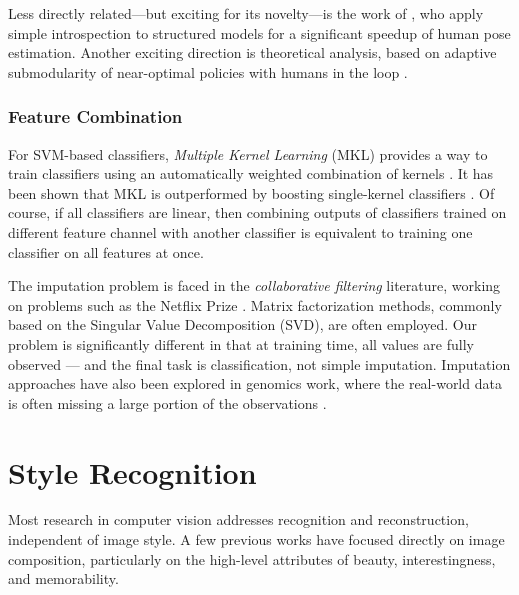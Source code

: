 Less directly related---but exciting for its novelty---is the work of \parencite{Weiss-ICCV-2013}, who apply simple introspection to structured models for a significant speedup of human pose estimation.
Another exciting direction is theoretical analysis, based on adaptive submodularity \parencite{Golovin-and-Krause-2010-JAIR} of near-optimal policies with humans in the loop \parencite{Chen-2014-ICML}.



\subsubsection{Feature Combination}

For SVM-based classifiers, \emph{Multiple Kernel Learning} (MKL) provides a way to train classifiers using an automatically weighted combination of kernels \parencite{Lanckriet2004}.
It has been shown that MKL is outperformed by boosting single-kernel classifiers \parencite{Gehler2009}.
Of course, if all classifiers are linear, then combining outputs of classifiers trained on different feature channel with another classifier is equivalent to training one classifier on all features at once.

The imputation problem is faced in the \emph{collaborative filtering} literature, working on problems such as the Netflix Prize \parencite{Koren-2009}.
Matrix factorization methods, commonly based on the Singular Value Decomposition (SVD), are often employed.
Our problem is significantly different in that at training time, all values are fully observed --- and the final task is classification, not simple imputation.
Imputation approaches have also been explored in genomics work, where the real-world data is often missing a large portion of the observations \parencite{Hastie-1999}.

\section{Style Recognition}

Most research in computer vision addresses recognition and reconstruction, independent of image style.
A few previous works have focused directly on image composition, particularly on the high-level attributes of beauty, interestingness, and memorability.

